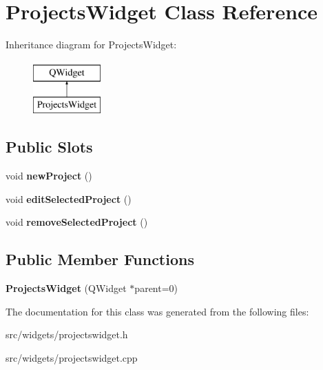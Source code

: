 \hypertarget{classProjectsWidget}{\section{Projects\+Widget Class Reference}
\label{classProjectsWidget}
}
Inheritance diagram for Projects\+Widget\+:\begin{figure}[H]
\begin{center}
\leavevmode
\includegraphics[height=2.000000cm]{de/da7/classProjectsWidget}
\end{center}
\end{figure}
\subsection*{Public Slots}
\begin{DoxyCompactItemize}
\item 
\hypertarget{classProjectsWidget_a9a3e158093ed435a68d4d9874a22a128}{void {\bfseries new\+Project} ()}\label{classProjectsWidget_a9a3e158093ed435a68d4d9874a22a128}

\item 
\hypertarget{classProjectsWidget_a026e17f035717e382f4afca6896a72d3}{void {\bfseries edit\+Selected\+Project} ()}\label{classProjectsWidget_a026e17f035717e382f4afca6896a72d3}

\item 
\hypertarget{classProjectsWidget_a038205ca1dee68dadae84e31dabfd7fc}{void {\bfseries remove\+Selected\+Project} ()}\label{classProjectsWidget_a038205ca1dee68dadae84e31dabfd7fc}

\end{DoxyCompactItemize}
\subsection*{Public Member Functions}
\begin{DoxyCompactItemize}
\item 
\hypertarget{classProjectsWidget_a542fb678c61897b56c86dc58524bd969}{{\bfseries Projects\+Widget} (Q\+Widget $\ast$parent=0)}\label{classProjectsWidget_a542fb678c61897b56c86dc58524bd969}

\end{DoxyCompactItemize}


The documentation for this class was generated from the following files\+:\begin{DoxyCompactItemize}
\item 
src/widgets/projectswidget.\+h\item 
src/widgets/projectswidget.\+cpp\end{DoxyCompactItemize}
